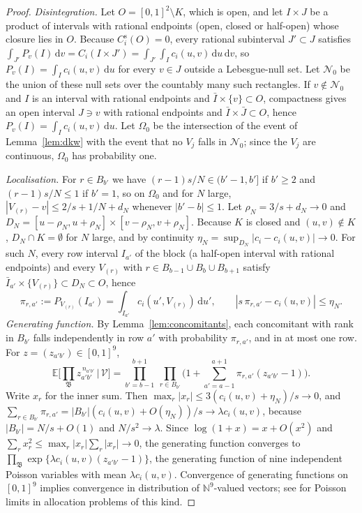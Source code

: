 \documentclass[11pt,a4paper]{article}
\theoremstyle{definition}
\theoremstyle{remark}
\newcommand{\E}{\mathbb{E}}
\newcommand{\cV}{\mathcal{V}}
\newcommand{\cN}{\mathcal{N}}
\begin{document}
\begin{proof}
\emph{Disintegration.} Let $O=[0,1]^2\setminus K$, which is open, and let $I\times J$ be a product of intervals with rational endpoints (open, closed or half-open) whose closure lies in $O$. Because $C_i^{\mathrm s}(O)=0$, every rational subinterval $J'\subset J$ satisfies $\int_{J'}P_v(I)\,\mathrm{d}v=C_i(I\times J')=\int_{J'}\!\int_Ic_i(u,v)\,\mathrm{d}u\,\mathrm{d}v$, so $P_v(I)=\int_Ic_i(u,v)\,\mathrm{d}u$ for every $v\in J$ outside a Lebesgue-null set. Let $\cN_0$ be the union of these null sets over the countably many such rectangles. If $v\notin\cN_0$ and $I$ is an interval with rational endpoints and $\bar I\times\{v\}\subset O$, compactness gives an open interval $J\ni v$ with rational endpoints and $\bar I\times\bar J\subset O$, hence $P_v(I)=\int_Ic_i(u,v)\,\mathrm{d}u$. Let $\Omega_0$ be the intersection of the event of Lemma~\ref{lem:dkw} with the event that no $V_j$ falls in $\cN_0$; since the $V_j$ are continuous, $\Omega_0$ has probability one.

\emph{Localisation.} For $r\in B_{b'}$ we have $(r-1)s/N\in(b'-1,b']$ if $b'\ge2$ and $(r-1)s/N\le1$ if $b'=1$, so on $\Omega_0$ and for $N$ large, $|V_{(r)}-v|\le 2/s+1/N+d_N$ whenever $|b'-b|\le1$. Let $\rho_N=3/s+d_N\to0$ and $D_N=[u-\rho_N,u+\rho_N]\times[v-\rho_N,v+\rho_N]$. Because $K$ is closed and $(u,v)\notin K$, $D_N\cap K=\emptyset$ for $N$ large, and by continuity $\eta_N=\sup_{D_N}|c_i-c_i(u,v)|\to0$. For such $N$, every row interval $I_{a'}$ of the block (a half-open interval with rational endpoints) and every $V_{(r)}$ with $r\in B_{b-1}\cup B_b\cup B_{b+1}$ satisfy $\bar I_{a'}\times\{V_{(r)}\}\subset D_N\subset O$, hence
\[
\pi_{r,a'}:=P_{V_{(r)}}(I_{a'})=\int_{I_{a'}}c_i(u',V_{(r)})\,\mathrm{d}u',\qquad |s\,\pi_{r,a'}-c_i(u,v)|\le\eta_N .
\]
\emph{Generating function.} By Lemma~\ref{lem:concomitants}, each concomitant with rank in $B_{b'}$ falls independently in row $a'$ with probability $\pi_{r,a'}$, and in at most one row. For $z=(z_{a'b'})\in[0,1]^9$,
\[
\E\Big[\prod_{\mathfrak B}z_{a'b'}^{\,n_{a'b'}}\,\Big|\,\cV\Big]=\prod_{b'=b-1}^{b+1}\ \prod_{r\in B_{b'}}\Big(1+\sum_{a'=a-1}^{a+1}\pi_{r,a'}(z_{a'b'}-1)\Big).
\]
Write $x_r$ for the inner sum. Then $\max_r|x_r|\le3(c_i(u,v)+\eta_N)/s\to0$, and $\sum_{r\in B_{b'}}\pi_{r,a'}=|B_{b'}|(c_i(u,v)+O(\eta_N))/s\to\lambda c_i(u,v)$, because $|B_{b'}|=N/s+O(1)$ and $N/s^2\to\lambda$. Since $\log(1+x)=x+O(x^2)$ and $\sum_r x_r^2\le\max_r|x_r|\sum_r|x_r|\to0$, the generating function converges to $\prod_{\mathfrak B}\exp\{\lambda c_i(u,v)(z_{a'b'}-1)\}$, the generating function of nine independent Poisson variables with mean $\lambda c_i(u,v)$. Convergence of generating functions on $[0,1]^9$ implies convergence in distribution of $\mathbb N^9$-valued vectors; see \citet{kolchin1978} for Poisson limits in allocation problems of this kind.
\end{proof}
\end{document}
